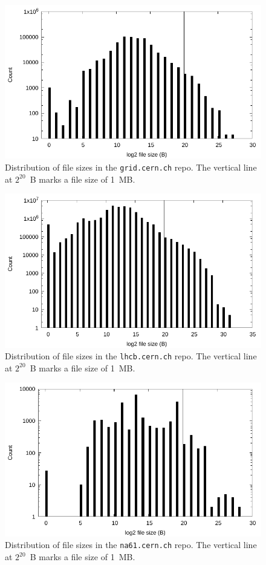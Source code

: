 \documentclass[sigconf]{acmart}
\begin{document}
\begin{figure}
\includegraphics[width=\linewidth]{plots/file-hist/grid.pdf}
\caption{Distribution of file sizes in the \texttt{grid.cern.ch} repo.
The vertical line at $2^{20}$~B marks a file size of 1~MB.}
\end{figure}

\begin{figure}
\includegraphics[width=\linewidth]{plots/file-hist/lhcb.pdf}
\caption{Distribution of file sizes in the \texttt{lhcb.cern.ch} repo.
The vertical line at $2^{20}$~B marks a file size of 1~MB.}
\end{figure}

\begin{figure}
\includegraphics[width=\linewidth]{plots/file-hist/na61.pdf}
\caption{Distribution of file sizes in the \texttt{na61.cern.ch} repo.
The vertical line at $2^{20}$~B marks a file size of 1~MB.}
\end{figure}
\end{document}

